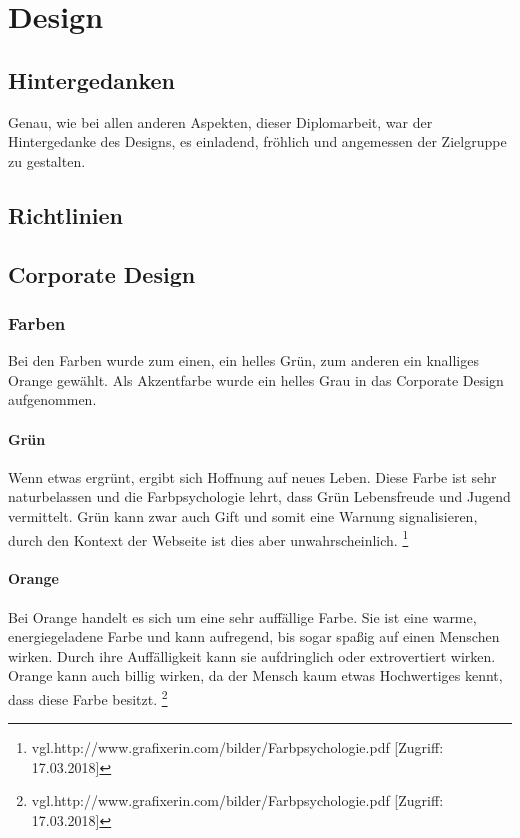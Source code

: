 \chapter{Design}
\renewcommand{\kapitelautor}{Autor: Niklas Kienreich}

\section{Hintergedanken}
Genau, wie bei allen anderen Aspekten, dieser Diplomarbeit, war der Hintergedanke des Designs, es einladend, fröhlich und angemessen der Zielgruppe zu gestalten.

\section{Richtlinien}
\section{Corporate Design}
\subsection{Farben}
Bei den Farben wurde zum einen, ein helles Grün, zum anderen ein knalliges Orange gewählt. Als Akzentfarbe wurde ein helles Grau in das Corporate Design aufgenommen.

\subsubsection{Grün}
Wenn etwas ergrünt, ergibt sich Hoffnung auf neues Leben. Diese Farbe ist sehr naturbelassen und die Farbpsychologie lehrt, dass Grün Lebensfreude und Jugend vermittelt. Grün kann zwar auch Gift und somit eine Warnung signalisieren, durch den Kontext der Webseite ist dies aber unwahrscheinlich. \footnote{\label{} vgl.http://www.grafixerin.com/bilder/Farbpsychologie.pdf [Zugriff: 17.03.2018]}

\subsubsection{Orange}
Bei Orange handelt es sich um eine sehr auffällige Farbe. Sie ist eine warme, energiegeladene Farbe und kann aufregend, bis sogar spaßig auf einen Menschen wirken. Durch ihre Auffälligkeit kann sie aufdringlich oder extrovertiert wirken. Orange kann auch billig wirken, da der Mensch kaum etwas Hochwertiges kennt, dass diese Farbe besitzt. \footnote{\label{} vgl.http://www.grafixerin.com/bilder/Farbpsychologie.pdf [Zugriff: 17.03.2018]}

